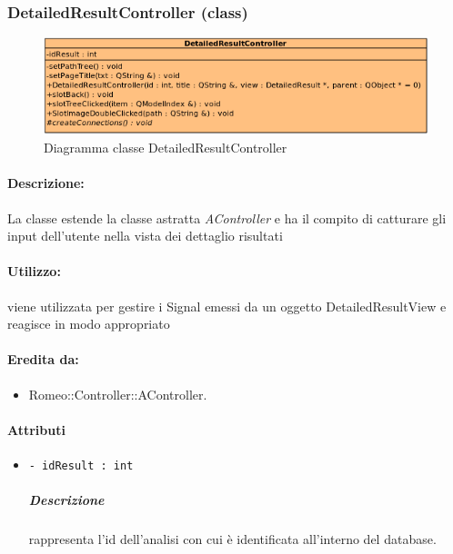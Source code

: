 	\subsubsection{DetailedResultController (class)}
	\begin{figure}[!h]
		\centering
		\includegraphics[width=0.75\linewidth]{./Content/Immagini/controller/DetailedResultController.png}
		\caption{Diagramma classe DetailedResultController}
	\end{figure}
	\paragraph{Descrizione:} La classe estende la classe astratta \textsl{AController} e ha il compito di catturare gli input dell'utente nella vista dei dettaglio risultati
	\paragraph{Utilizzo:} viene utilizzata per gestire i Signal\g{} emessi da un oggetto DetailedResultView e reagisce in modo appropriato
	\paragraph{Eredita da:}
		\begin{itemize}
			\item Romeo::Controller::AController.
		\end{itemize}
	\paragraph{Attributi}
		\begin{itemize}
			\item \color{teal} \verb!- idResult : int!
			\color{black}
			\subparagraph{Descrizione} rappresenta l'id dell'analisi con cui è identificata all'interno del database.
		\end{itemize}
